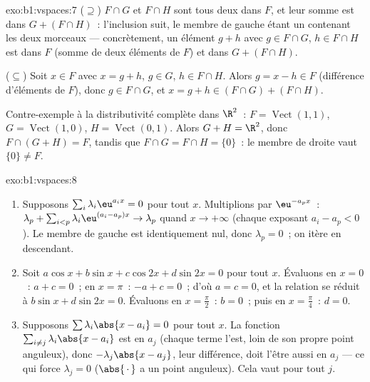 \begin{solution}{exo:b1:vspaces:7}
($\supseteq$) $F \cap G$ et $F \cap H$ sont tous deux dans $F$, et leur
somme est dans $G + (F \cap H)$~: l'inclusion suit, le membre de gauche
étant un  contenant les deux morceaux --- concrètement, un
élément $g + h$ avec $g \in F\cap G$, $h \in F \cap H$ est dans $F$
(somme de deux éléments de $F$) et dans $G + (F \cap H)$.

($\subseteq$) Soit $x \in F$ avec $x = g + h$, $g \in G$, $h \in F
\cap H$. Alors $g = x - h \in F$ (différence d'éléments de $F$), donc
$g \in F \cap G$, et $x = g + h \in (F \cap G) + (F \cap H)$.

Contre-exemple à la distributivité complète dans $\R^2$~: $F =
\operatorname{Vect}(1,1)$, $G = \operatorname{Vect}(1,0)$, $H =
\operatorname{Vect}(0,1)$. Alors $G + H = \R^2$, donc $F \cap (G+H) =
F$, tandis que $F \cap G = F \cap H = \{0\}$~: le membre de droite vaut
$\{0\} \neq F$.
\end{solution}

\begin{solution}{exo:b1:vspaces:8}
\begin{enumerate}
  \item Supposons $\sum_{i} \lambda_i \eu^{a_i x} = 0$ pour tout $x$.
        Multiplions par $\eu^{-a_p x}$~: $\lambda_p + \sum_{i < p}
        \lambda_i \eu^{(a_i - a_p)x} \to \lambda_p$ quand $x \to
        +\infty$ (chaque exposant $a_i - a_p < 0$). Le membre de
        gauche est identiquement nul, donc $\lambda_p = 0$~; on itère
        en descendant.
  \item Soit $a\cos x + b \sin x + c \cos 2x + d\sin 2x = 0$ pour tout
        $x$. Évaluons en $x = 0$~: $a + c = 0$~; en $x = \pi$~: $-a + c
        = 0$~; d'où $a = c = 0$, et la relation se réduit à $b\sin
        x + d \sin 2x = 0$. Évaluons en $x = \frac\pi2$~: $b = 0$~;
        puis en $x = \frac\pi4$~: $d = 0$.
  \item Supposons $\sum \lambda_i \abs{x - a_i} = 0$ pour tout $x$. La
        fonction $\sum_{i \neq j} \lambda_i\abs{x - a_i}$ est
         en $a_j$ (chaque terme l'est, loin de son propre
        point anguleux), donc $-\lambda_j \abs{x - a_j}$, leur
        différence, doit l'être aussi en $a_j$ --- ce qui force
        $\lambda_j = 0$ ($\abs{\,\cdot\,}$ a un point anguleux). Cela
        vaut pour tout $j$.
\end{enumerate}
\end{solution}

